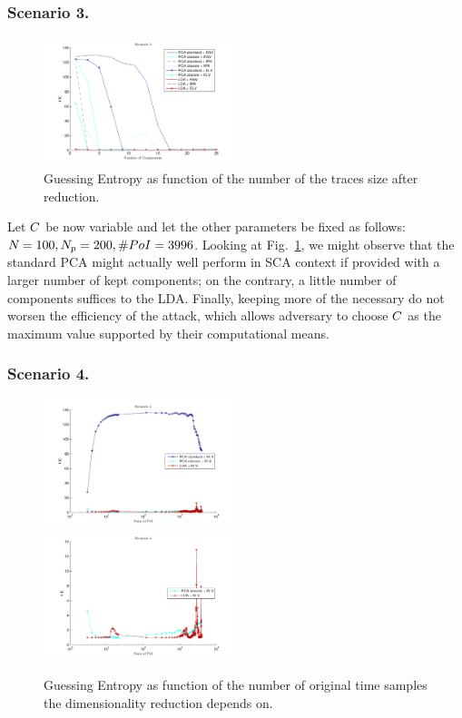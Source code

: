 \subsubsection{Scenario 3.}
\begin{figure}
\centering
\includegraphics[width=0.5\textwidth]{figures/Criterion3.pdf}
\caption{Guessing Entropy as function of the number of the traces size after reduction.}\label{fig:3}
\end{figure}


Let  $\newTraceLength$ be now variable and let the other parameters be fixed as follows: $\numTraces[] = 100, N_p=200, \numPoI = 3996$. Looking at Fig.~\ref{fig:3}, we might observe that the standard PCA might actually well perform in SCA context if provided with a larger number of kept components; on the contrary, a little number of components suffices to the LDA. Finally, keeping more of the necessary do not worsen the efficiency of the attack, which allows adversary to choose $\newTraceLength$ as the maximum value supported by their computational means.



\subsubsection{Scenario 4.}
\begin{figure}
\includegraphics[width=0.5\textwidth]{figures/Criterion4.pdf}
\includegraphics[width=0.5\textwidth]{figures/Criterion4cutted.pdf} 
\caption{Guessing Entropy as function of the number of original time samples the dimensionality reduction depends on.}\label{fig:4}
\end{figure}

